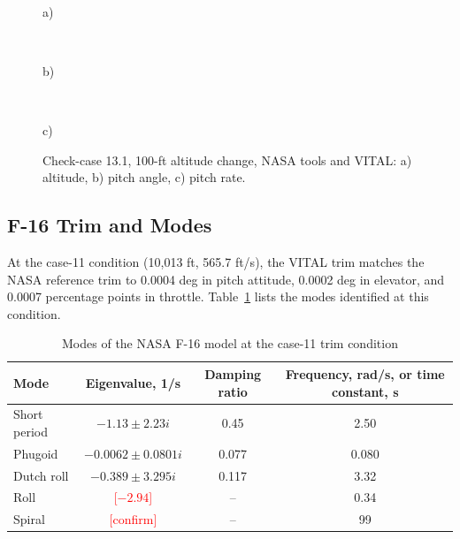 \documentclass[conf]{new-aiaa}
\newcommand{\tbd}[1]{\textcolor{red}{[#1]}}
\begin{document}
\begin{figure}[hbt!]
\centering
\begin{minipage}[t]{0.32\textwidth}\centering
  \fbox{\parbox[c][1.5in][c]{0.9\linewidth}{\centering\tbd{Altitude, ft}}}\\[2pt]
  \raggedright a)
\end{minipage}\hfill
\begin{minipage}[t]{0.32\textwidth}\centering
  \fbox{\parbox[c][1.5in][c]{0.9\linewidth}{\centering\tbd{Pitch angle, deg}}}\\[2pt]
  \raggedright b)
\end{minipage}\hfill
\begin{minipage}[t]{0.32\textwidth}\centering
  \fbox{\parbox[c][1.5in][c]{0.9\linewidth}{\centering\tbd{Pitch rate, deg/s}}}\\[2pt]
  \raggedright c)
\end{minipage}
\caption{\label{fig:case131} Check-case 13.1, 100-ft altitude change, NASA tools and VITAL:
a) altitude, b) pitch angle, c) pitch rate.}
\end{figure}

\subsection{F-16 Trim and Modes}
At the case-11 condition (10,013 ft, 565.7 ft/s), the VITAL trim matches the NASA reference
trim to 0.0004 deg in pitch attitude, 0.0002 deg in elevator, and 0.0007 percentage points in
throttle. Table~\ref{tab:modes} lists the modes identified at this condition.

\begin{table}[hbt!]
\caption{\label{tab:modes} Modes of the NASA F-16 model at the case-11 trim condition}
\centering
\begin{tabular}{lccc}
\hline\hline
Mode & Eigenvalue, 1/s & Damping ratio & Frequency, rad/s, or time constant, s \\\hline
Short period & $-1.13 \pm 2.23i$     & 0.45  & 2.50 \\
Phugoid      & $-0.0062 \pm 0.0801i$ & 0.077 & 0.080 \\
Dutch roll   & $-0.389 \pm 3.295i$   & 0.117 & 3.32 \\
Roll         & \tbd{$-2.94$}         & --    & 0.34 \\
Spiral       & \tbd{confirm}         & --    & 99 \\
\hline\hline
\end{tabular}
\end{table}
\end{document}
